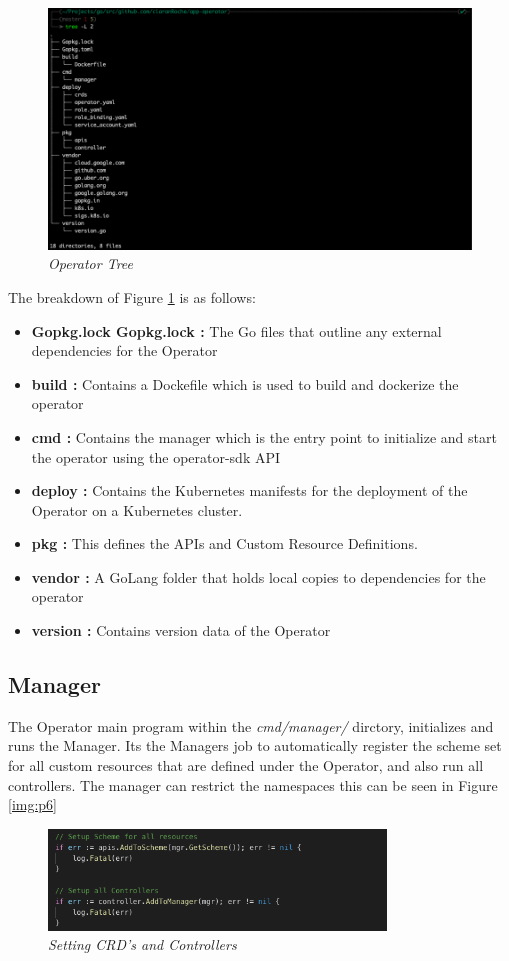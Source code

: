 \begin{figure}[!ht]
\centering
\includegraphics*[width=1\textwidth]{images/p5.png}
\caption{\em Operator Tree}
\label{img:p5}
\end{figure}

The breakdown of Figure \ref{img:p5} is as follows:
\begin{itemize}
    \item \textbf{Gopkg.lock Gopkg.lock :} The Go files that outline any external dependencies for the Operator
    \item \textbf{build :} Contains a Dockefile which is used to build and dockerize the operator
    \item \textbf{cmd :} Contains the manager which is the entry point to initialize and start the operator using the operator-sdk API
    \item \textbf{deploy :} Contains the Kubernetes manifests for the deployment of the Operator on a Kubernetes cluster.
    \item \textbf{pkg :} This defines the APIs and Custom Resource Definitions.
    \item \textbf{vendor :} A GoLang folder that holds local copies to dependencies for the operator
    \item \textbf{version :} Contains version data of the Operator
\end{itemize}

\subsection{Manager}
\label{sub:manager}
The Operator main program within the \textit{cmd/manager/} dirctory, initializes and runs the Manager. Its the Managers job to automatically register the scheme set for all custom resources that are defined under the Operator, and also run all controllers. The manager can restrict the namespaces this can be seen in Figure \ref{img:p6}
\begin{figure}[!ht]
\centering
\includegraphics*[width=0.8\textwidth]{images/p7.png}
\caption{\em Setting CRD's and Controllers}
\label{img:p7}
\end{figure}

